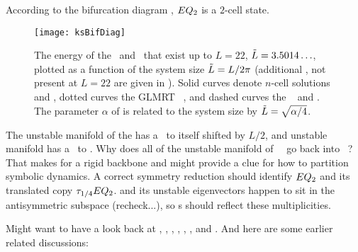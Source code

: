 \begin{description}
According to the bifurcation diagram , %
$EQ_{2}$ is a $2$-cell state.

\begin{figure}[t]       \label{fig:ksBifDiag}
\begin{center}
\texttt{[image: ksBifDiag]}
\end{center}
\caption{
The energy %
of the \eqva\ and \reqva\ that
exist up to $L=22$, $\tilde{L} = 3.5014\ldots$, plotted as a function
of the system size $\tilde{L} = L/2\pi$ (additional \eqva, not present
at $L = 22$ are given in ). Solid curves denote
$n$-cell solutions  and , dotted curves the GLMRT
\eqv\ ,
and dashed curves the \reqva\  and .
The parameter $\alpha$ of  is
related to the system size by $\tilde{L}=\sqrt{\alpha/4}$.
        }
\end{figure}



The unstable manifold of the 
has a \hec\ to itself  shifted by
$L/2$, and  unstable manifold has a \hec\ to .
Why does all of the unstable manifold of
~\eqv\ go back
into
~\eqv?
That makes for a rigid backbone and might provide a clue for how to
partition symbolic dynamics.
A correct symmetry reduction should identify
$EQ_{2}$ and its translated copy $\tau_{1/4}EQ_{2}$.
 and its unstable eigenvectors
happen to sit in the antisymmetric subspace
(recheck...), so \hec s should reflect these multiplicities.

Might want to have a look back at ,
,
,
,
,
,
and
.
And here are some earlier related discussions:


\end{description}
